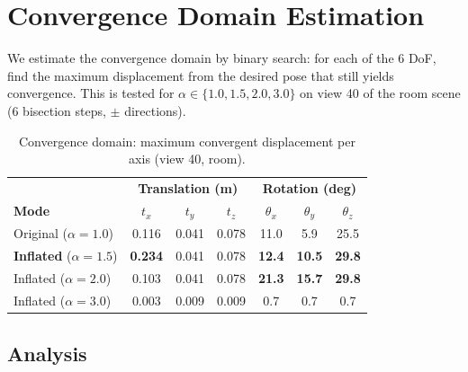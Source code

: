 \documentclass[11pt]{article}
\begin{document}
\section{Convergence Domain Estimation}
\label{sec:conv_domain}

We estimate the convergence domain by binary search: for each of the 6 DoF, find the maximum displacement from the desired pose that still yields convergence. This is tested for $\alpha \in \{1.0, 1.5, 2.0, 3.0\}$ on view 40 of the room scene (6 bisection steps, $\pm$ directions).

\begin{table}[h!]
\centering
\caption{Convergence domain: maximum convergent displacement per axis (view 40, room).}
\label{tab:conv_domain}
\begin{tabular}{l|ccc|ccc}
\toprule
& \multicolumn{3}{c|}{\textbf{Translation (m)}} & \multicolumn{3}{c}{\textbf{Rotation (deg)}} \\
\textbf{Mode} & $t_x$ & $t_y$ & $t_z$ & $\theta_x$ & $\theta_y$ & $\theta_z$ \\
\midrule
Original ($\alpha=1.0$)  & 0.116 & 0.041 & 0.078 & 11.0 & 5.9 & 25.5 \\
\textbf{Inflated} ($\alpha=1.5$)  & \textbf{0.234} & 0.041 & 0.078 & \textbf{12.4} & \textbf{10.5} & \textbf{29.8} \\
Inflated ($\alpha=2.0$)  & 0.103 & 0.041 & 0.078 & \textbf{21.3} & \textbf{15.7} & \textbf{29.8} \\
Inflated ($\alpha=3.0$)  & 0.003 & 0.009 & 0.009 & 0.7 & 0.7 & 0.7 \\
\bottomrule
\end{tabular}
\end{table}

\subsection{Analysis}
\end{document}
